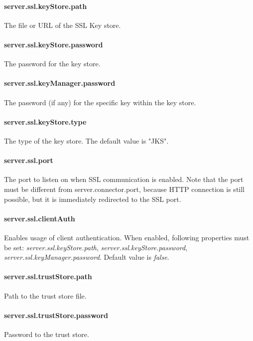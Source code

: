 \paragraph{server.ssl.keyStore.path}
The file or URL of the SSL Key store.

\paragraph{server.ssl.keyStore.password}
The password for the key store.

\paragraph{server.ssl.keyManager.password}
The password (if any) for the specific key within the key store.

\paragraph{server.ssl.keyStore.type}
The type of the key store. The default value is "JKS".

\paragraph{server.ssl.port}
The port to listen on when SSL communication is enabled. Note that the port must
be different from server.connector.port, because HTTP connection is still
possible, but it is immediately redirected to the SSL port.

\paragraph{server.ssl.clientAuth}
Enables usage of client authentication. When enabled, following properties must
be set: \emph{server.ssl.keyStore.path}, \emph{server.ssl.keyStore.password},
\emph{server.ssl.keyManager.password}. Default value is \emph{false}.

\paragraph{server.ssl.trustStore.path}
Path to the trust store file.

\paragraph{server.ssl.trustStore.password}
Password to the trust store.

